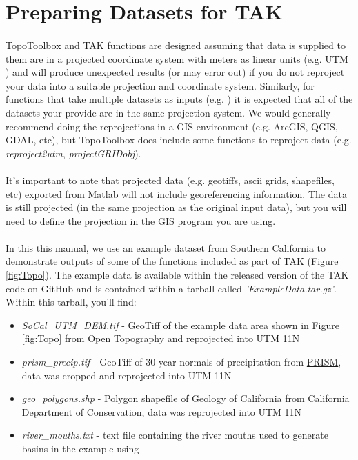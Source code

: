 \section{Preparing Datasets for TAK} \label{sec:exmpl}
\paragraph{}TopoToolbox and TAK functions are designed assuming that data is supplied to them are in a projected coordinate system with meters as linear units (e.g. UTM ) and will produce unexpected results (or may error out) if you do not reproject your data into a suitable projection and coordinate system. Similarly, for functions that take multiple datasets as inputs (e.g. ) it is expected that all of the datasets your provide are in the same projection system. We would generally recommend doing the reprojections in a GIS environment (e.g. ArcGIS, QGIS, GDAL, etc), but TopoToolbox does include some functions to reproject data (e.g. \textit{reproject2utm}, \textit{projectGRIDobj}).

\paragraph{}It's important to note that projected data (e.g. geotiffs, ascii grids, shapefiles, etc) exported from Matlab will not include georeferencing information. The data is still projected (in the same projection as the original input data), but you will need to define the projection in the GIS program you are using.

\paragraph{}In this this manual, we use an example dataset from Southern California to demonstrate outputs of some of the functions included as part of TAK (Figure \ref{fig:Topo}). The example data is available within the released version of the TAK code on GitHub and is contained within a tarball called \textit{'ExampleData.tar.gz'}. Within this tarball, you'll find:

\begin{itemize}
	\item \textit{SoCal\_UTM\_DEM.tif} - GeoTiff of the example data area shown in Figure \ref{fig:Topo} from \href{http://opentopography.org/}{Open Topography} and reprojected into UTM 11N
	\item \textit{prism\_precip.tif} - GeoTiff of 30 year normals of precipitation from \href{http://www.prism.oregonstate.edu/normals/}{PRISM}, data was cropped and reprojected into UTM 11N
	\item \textit{geo\_polygons.shp} - Polygon shapefile of Geology of California from \href{https://maps.conservation.ca.gov/cgs/#datalist}{California Department of Conservation}, data was reprojected into UTM 11N
	\item \textit{river\_mouths.txt} - text file containing the river mouths used to generate basins in the example using 
\end{itemize} 

